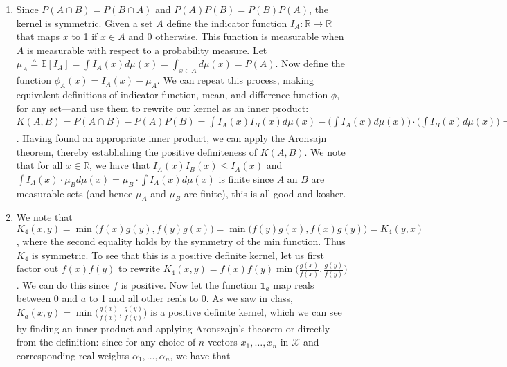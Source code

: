 \documentclass[12pt]{article}
\newenvironment{exercise}[2][Exercise]{\begin{trivlist}
\item[\hskip \labelsep {\bfseries #1}\hskip \labelsep {\bfseries #2.}]}{\end{trivlist}}
\begin{document}
\begin{exercise}{1}
\begin{enumerate}
		\item Since $P(A \cap B) = P(B \cap A)$ and $P(A)P(B) = P(B)P(A)$, the kernel is symmetric. Given a set $A$ define the indicator function $I_A: \mathbb{R} \rightarrow \mathbb{R}$ that maps $x$ to 1 if $x\in A$ and 0 otherwise. This function is measurable when $A$ is measurable with respect to a probability measure. Let $\mu_A \triangleq \mathbb{E}[I_A] = \int I_A (x) d \mu (x) = \int_{x \in A} d \mu (x) = P(A).$ Now define the function $\phi_A(x) = I_A(x) - \mu_A.$ We can repeat this process, making equivalent definitions of indicator function, mean, and difference function $\phi$, for any set---and use them to rewrite our kernel as an inner product: $K(A,B) = P(A\cap B) - P(A)P(B) = \int I_A (x) I_B(x) d \mu(x) - \big(\int I_A(x) d \mu(x) \big) \cdot \big(\int I_B(x) d\mu(x)\big) = \mathbb{E}[I_A I_B] - \mathbb{E}[I_A]\mathbb{E}[I_B] =\mathbb{E}[I_AI_B] - \mu_A\mu_B = \mathbb{E}[I_AI_B] - \mu_A\mathbb{E}[I_B] - \mu_B \mathbb{E}[I_A] -\mu_A\mu_B = \mathbb{E}[(I_A -\mu_A)(I_B - \mu_B)] = \int \phi_A (x) \phi_B (x) d \mu (x) = \langle \phi_A, \phi_B \rangle_{L_2(\mu)}$. Having found an appropriate inner product, we can apply the Aronsajn theorem, thereby establishing the positive definiteness of $K(A,B)$. We note that for all $x\in \mathbb{R}$, we have that $I_A(x)I_B(x) \leq I_A(x)$ and $\int I_A(x) \cdot \mu_B d\mu(x) = \mu_B \cdot \int I_A(x) d\mu(x)$ is finite since $A$ an $B$ are measurable sets (and hence $\mu_A$ and $\mu_B$ are finite), this is all good and kosher.
		\item We note that $K_4(x,y) = \min \big(f(x)g(y), f(y)g(x)\big) = \min \big(f(y)g(x), f(x)g(y)\big) = K_4(y,x)$, where the second equality holds by the symmetry of the min function. Thus $K_4$ is symmetric. To see that this is a positive definite kernel, let us first factor out $f(x)f(y)$ to rewrite $K_4(x,y) = f(x)f(y)\min\big(\frac{g(x)}{f(x)}, \frac{g(y)}{f(y)}\big)$. We can do this since $f$ is positive. Now let the function $\mathbf{1}_a$ map reals between 0 and $a$ to 1 and all other reals to 0. As we saw in class, $K_a(x,y) = \min\big(\frac{g(x)}{f(x)}, \frac{g(y)}{f(y)}\big)$ is a positive definite kernel, which we can see by finding an inner product and applying Aronszajn's theorem or directly from the definition: since for any choice of $n$ vectors $x_1, \ldots , x_n$ in $\mathcal{X}$ and corresponding real weights $\alpha_1, \ldots, \alpha_n$, we have that 

\end{enumerate}
\end{exercise}
\end{document}
